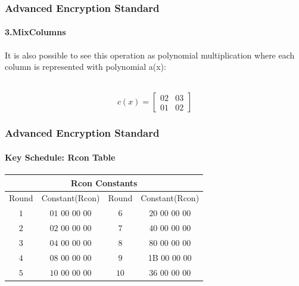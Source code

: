 \begin{frame}
	\frametitle{Advanced Encryption Standard}
		\framesubtitle{3.MixColumns }
		
	\begin{block}{}
    	{It is also possible to see this operation as polynomial multiplication where each column is represented with 				 	polynomial a(x):}\\
		\\
		
	\end{block}
	\vfill
	\begin{block}{}
	{ $$c(x)= \left[
        \begin{array}{cccc}
         02 & 03\\
         01 & 02
         \end{array}
      \right] $$}
	\end{block}
\end{frame}

\begin{frame}
	\frametitle{Advanced Encryption Standard}
		\framesubtitle{Key Schedule: Rcon Table}
		\begin{table}
			\begin{center}
				\setlength\arrayrulewidth{1pt}
				
				\begin{tabular}{|c|c|c|c|}
					\hline 
					\multicolumn{4}{|c|}{Rcon Constants}\\
					\hline
					\hline Round 	& Constant(Rcon)		 &Round  		& Constant(Rcon)		\\
					\hline $1$	 	& $01$ $00$ $00$ $00$    &$6$			&$20$ $00$ $00$ $00$  	\\
					\hline $2$	 	& $02$ $00$ $00$ $00$    &$7$			&$40$ $00$ $00$ $00$  	\\
					\hline $3$	 	& $04$ $00$ $00$ $00$    &$8$			&$80$ $00$ $00$ $00$  	\\
					\hline $4$	 	& $08$ $00$ $00$ $00$    &$9$			&1B $00$ $00$ $00$  	\\
					\hline $5$	 	& $10$ $00$ $00$ $00$    &$10$			&$36$ $00$ $00$ $00$  	\\
					\hline
				\end{tabular}
			\end{center}
		\end{table}

		\vfill
\end{frame}
 

